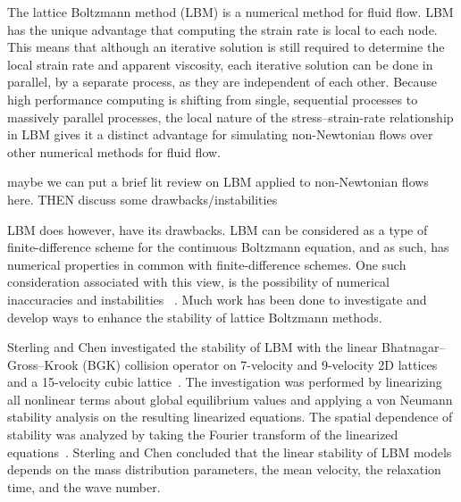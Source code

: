 \documentclass{article}
\begin{document}
The lattice Boltzmann method (LBM) is a numerical method for fluid flow.
LBM has the unique advantage that computing the strain rate is local to each node.
This means that although an iterative solution is still required to determine the local strain rate and apparent viscosity, each iterative solution can be done in parallel, by a separate process, as they are independent of each other.
Because high performance computing is shifting from single, sequential processes to massively parallel processes, the local nature of the stress--strain-rate relationship in LBM gives it a distinct advantage for simulating non-Newtonian flows over other numerical methods for fluid flow. %

{\color{red} maybe we can put a brief lit review on LBM applied to non-Newtonian flows here. THEN discuss some drawbacks/instabilities}

LBM does however, have its drawbacks.
LBM can be considered as a type of finite-difference scheme for the continuous Boltzmann equation, and as such, has numerical properties in common with finite-difference schemes. %
One such consideration associated with this view, is the possibility of numerical inaccuracies and instabilities ~\cite{sterling1993stability,sterling1996stability,bawazeer2013stability,lallemand2000theory}. %
Much work has been done to investigate and develop ways to enhance the stability of lattice Boltzmann methods.

Sterling and Chen investigated the stability of LBM with the linear Bhatnagar--Gross--Krook (BGK) collision operator on 7-velocity and 9-velocity 2D lattices and a 15-velocity cubic lattice~\cite{sterling1993stability,sterling1996stability}.
The investigation was performed by linearizing all nonlinear terms about global equilibrium values and applying a von Neumann stability analysis on the resulting linearized equations.
The spatial dependence of stability was analyzed by taking the Fourier transform of the linearized equations~\cite{sterling1993stability}.
Sterling and Chen concluded that the linear stability of LBM models depends on the mass distribution parameters, the mean velocity, the relaxation time, and the wave number. %
\end{document}
